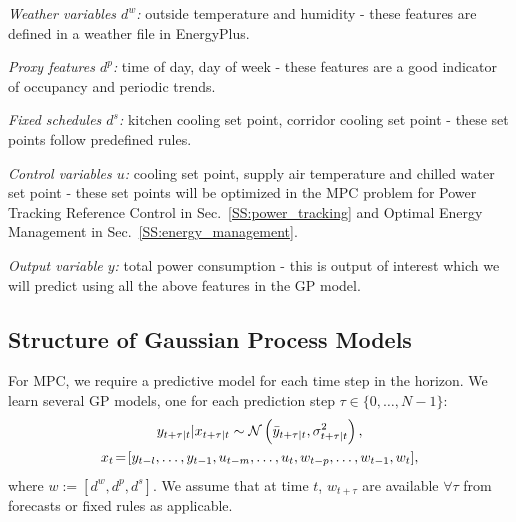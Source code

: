 \textit{Weather variables \(d^w\):} outside temperature and humidity - these features are defined in a weather file in EnergyPlus.

\textit{Proxy features \(d^p\):} time of day, day of week - these features are a good indicator of occupancy and periodic trends.

\textit{Fixed schedules  \(d^s\):} kitchen cooling set point, corridor cooling set point - these set points follow predefined rules. 

\textit{Control variables \(u\):} cooling set point, supply air temperature and chilled water set point - these set points will be optimized in the MPC problem for Power Tracking Reference Control in Sec.~\ref{SS:power_tracking} and Optimal Energy Management in Sec.~\ref{SS:energy_management}.

\textit{Output variable \(y\):} total power consumption - this is output of interest which we will predict using all the above features in the GP model.

\subsection{Structure of  Gaussian Process Models}

For MPC, we require a predictive model for each time step in the horizon.
We learn several GP models, one for each prediction step \( \tau \in \{0,\dots,N-1\}\):
\begin{gather}
\label{E:gp:casestudy}
y_{t+\tau|t} | x_{t+\tau|t} \sim \GaussianDist{\bar{y}_{t+\tau|t}}{\sigma^2_{t+\tau|t}}, \\
x_{t}\!=\![y_{t-l}, \dots, y_{t-1}, u_{t-m}, \dots, u_t, w_{t-p}, \dots, w_{t-1}, w_t], \nonumber
\end{gather}
where \(w:=[d^w, d^p, d^s]\). We assume that at time \(t\), \(w_{t+\tau}\) are available \(\forall \tau \) from forecasts or fixed rules as applicable.

